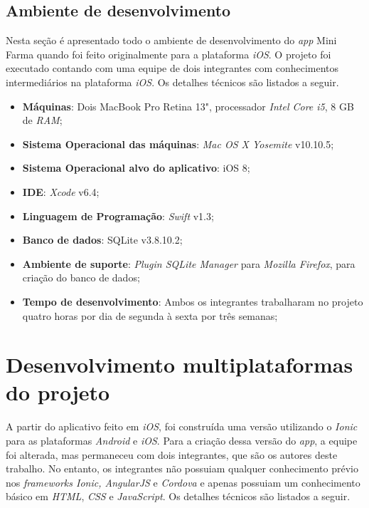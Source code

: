 \subsection{Ambiente de desenvolvimento} \label{subsec:ambientedesenvolvimento}
Nesta seção é apresentado todo o ambiente de desenvolvimento do \textit{app} Mini Farma quando foi feito originalmente para a plataforma \textit{iOS}. 
O projeto foi executado contando com uma equipe de dois integrantes com conhecimentos intermediários na plataforma \textit{iOS}. 
Os detalhes técnicos são listados a seguir.
\begin{itemize}
    \item \textbf{Máquinas}: Dois MacBook Pro Retina 13", processador \textit{Intel Core i5}, 8 GB de \textit{RAM};
    \item \textbf{Sistema Operacional das máquinas}: \textit{Mac OS X Yosemite} v10.10.5;
    \item \textbf{Sistema Operacional alvo do aplicativo}: iOS 8;
    \item \textbf{IDE}: \textit{Xcode} v6.4;
    \item \textbf{Linguagem de Programação}: \textit{Swift} v1.3;
    \item \textbf{Banco de dados}: SQLite v3.8.10.2;
    \item \textbf{Ambiente de suporte}: \textit{Plugin SQLite Manager} para \textit{Mozilla Firefox}, para criação do banco de dados;
    \item \textbf{Tempo de desenvolvimento}: Ambos os integrantes trabalharam no projeto quatro horas por dia de segunda à sexta por três semanas;
\end{itemize}

\section{Desenvolvimento multiplataformas do projeto} \label{sec:desenvolvimentomulti}

A partir do aplicativo feito em \textit{iOS}, foi construída uma versão utilizando o \textit{Ionic} para as plataformas \textit{Android} e \textit{iOS}.
Para a criação dessa versão do \textit{app}, a equipe foi alterada, mas permaneceu com dois integrantes, que são os autores deste trabalho.
No entanto, os integrantes não possuiam qualquer conhecimento prévio nos \textit{frameworks Ionic, AngularJS} e \textit{Cordova}
e apenas possuiam um conhecimento básico em \textit{HTML}, \textit{CSS} e \textit{JavaScript}. Os detalhes técnicos são listados a seguir.
   
